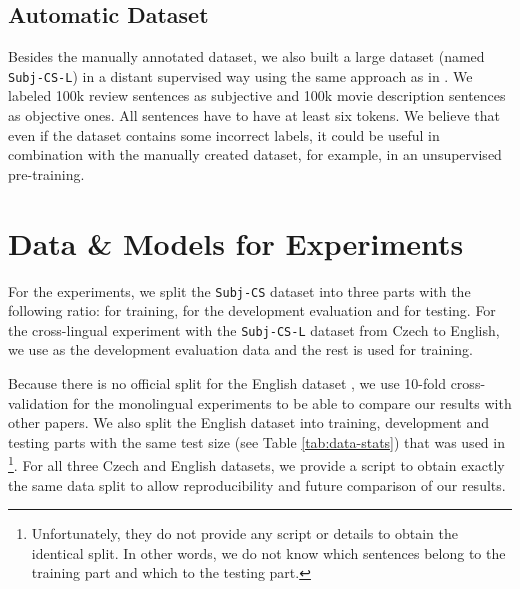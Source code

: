 \documentclass[10pt, a4paper]{article}
\begin{document}
\subsection{Automatic Dataset}
Besides the manually annotated dataset, we also built a large dataset (named \texttt{Subj-CS-L}) in a distant supervised way using the same approach as in \cite{english-dataset}. We labeled 100k review sentences as subjective and 100k movie description sentences as objective ones. All sentences have to have at least six tokens. We believe that even if the dataset contains some incorrect labels, it could be useful in combination with the manually created dataset, for example, in an unsupervised pre-training.



\section{Data \& Models for Experiments}
\label{sec:data-models}
For the experiments, we split the \texttt{Subj-CS} dataset into three parts with the following ratio:  for training,  for the development evaluation and  for testing.
For the cross-lingual experiment with the \texttt{Subj-CS-L} dataset from Czech to English, we use  as the development evaluation data and the rest is used for training.

\par Because there is no official split for the English dataset \cite{english-dataset}, we use 10-fold cross-validation for the monolingual experiments to be able to compare our results with other papers. We also split the English dataset into training, development and testing parts with the same test size (see Table \ref{tab:data-stats}) that was used in \cite{wang2021entailment-few-shot-learner}\footnote{Unfortunately, they do not provide any script or details to obtain the identical split. In other words, we do not know which sentences belong to the training part and which to the testing part.}. For all three Czech and English datasets, we provide a script to obtain exactly the same data split to allow reproducibility and future comparison of our results.
\end{document}
